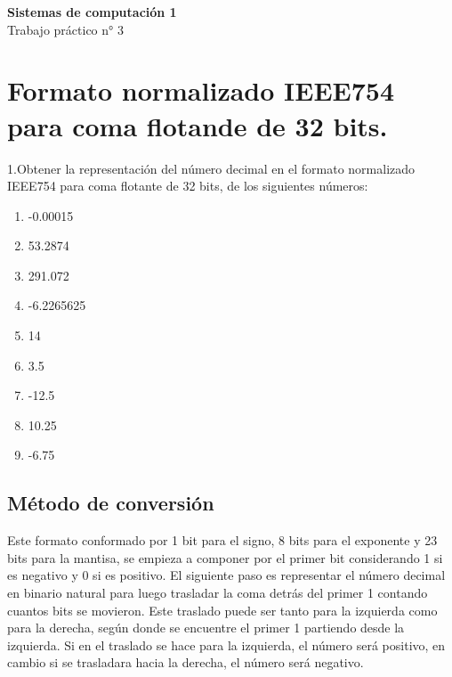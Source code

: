\documentclass[a4paper,12pt]{article}
\begin{document}
	
	\begin{center}
		
		\LARGE \textbf{Sistemas de computación 1} \\[0.5cm]
		\LARGE Trabajo práctico n° 3 \\
	\end{center}
	
	\section*{Formato normalizado IEEE754 para coma flotande de 32 bits.}
	
	1.Obtener la representación del número decimal en el formato normalizado IEEE754 para coma flotante de 32 bits, de los siguientes números:
	\begin{enumerate}
		\item -0.00015
		\item 53.2874
		\item 291.072
		\item -6.2265625
		\item 14
		\item 3.5
		\item -12.5
		\item 10.25
		\item -6.75	
	\end{enumerate}	

	\subsection*{Método de conversión}
	Este formato conformado por 1 bit para el signo, 8 bits para el exponente y 23 bits para la mantisa, se empieza a componer por el primer bit considerando 1 si es negativo y 0 si es positivo. El siguiente paso es representar el número decimal en binario natural para luego trasladar la coma detrás del primer 1 contando cuantos bits se movieron. Este traslado puede ser tanto para la izquierda como para la derecha, según donde se encuentre el primer 1 partiendo desde la izquierda. Si en el traslado se hace para la izquierda, el número será positivo, en cambio si se trasladara hacia la derecha, el número será negativo. 
	
\end{document}
